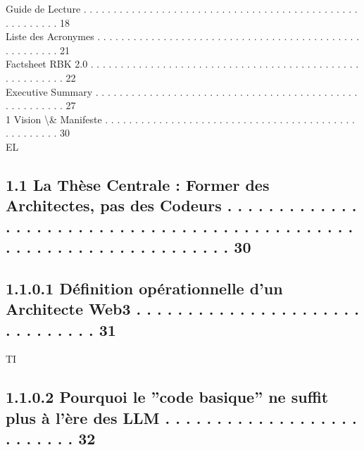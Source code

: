 \documentclass[12pt,landscape,a4paper]{article}
\begin{document}
Guide de Lecture . . . . . . . . . . . . . . . . . . . . . . . . . . . . . . . . . . . . . . . . . . . . . . . . . . . . . . . 18\\
Liste des Acronymes . . . . . . . . . . . . . . . . . . . . . . . . . . . . . . . . . . . . . . . . . . . . . . . . . . . . . 21\\
Factsheet RBK 2.0 . . . . . . . . . . . . . . . . . . . . . . . . . . . . . . . . . . . . . . . . . . . . . . . . . . . . . . . 22\\
Executive Summary . . . . . . . . . . . . . . . . . . . . . . . . . . . . . . . . . . . . . . . . . . . . . . . . . . . . . . 27\\
1     Vision \textbackslash{}& Manifeste . . . . . . . . . . . . . . . . . . . . . . . . . . . . . . . . . . . . . . . . . . . . . . . . . . . 30\\
\vspace{0.5em}
\vspace{0.5em}
\vspace{0.5em}
\vspace{0.5em}
EL\\
\subsection{1.1     La Thèse Centrale : Former des Architectes, pas des Codeurs . . . . . . . . . . . . . . . . . . . . . . . . . . . . . . . . . . . . . . . . . . . . . . . . . . . . . . . . . . . . . . . . . . . . . 30}
\subsection{1.1.0.1           Définition opérationnelle d’un Architecte Web3 . . . . . . . . . . . . . . . . . . . . . . . . . . . . . . .                                                                                                               31}
\vspace{0.5em}
\vspace{0.5em}
\vspace{0.5em}
\vspace{0.5em}
TI\\
\subsection{1.1.0.2           Pourquoi le ”code basique” ne suffit plus à l’ère des LLM . . . . . . . . . . . . . . . . . . . . . . . . . .                                                                                                              32}
\end{document}

